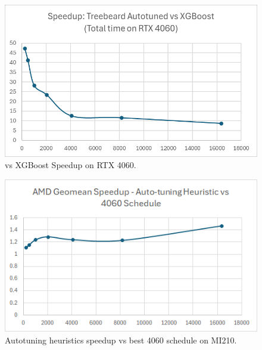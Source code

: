\begin{figure}[htb]
  \centering
  \includegraphics[width=\linewidth]{figures/TBvsXGB_TotalTime.png}
  \caption{\Treebeard{} vs XGBoost Speedup on RTX 4060.}
  \label{Fig:TBvsXGBoost_Speedup}
\end{figure}

\begin{figure}[htb]
  \centering
  \includegraphics[width=\linewidth]{figures/AMD_MI210_ATHeuristicVs4060Sched_speedup.png}
  \caption{Autotuning heuristics speedup vs best 4060 schedule on MI210.}
  \label{Fig:AMD_MI210_ATHeuristicVs4060Sched_speedup}
\end{figure}

